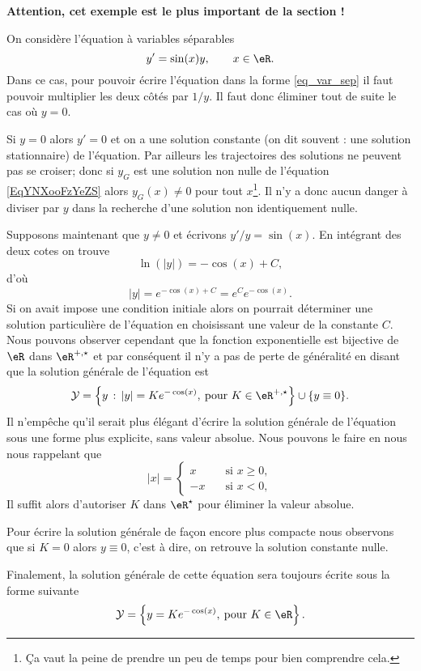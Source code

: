 \begin{example}\label{exemple_eq_hom}
  \textbf{Attention, cet exemple est le plus important de la section !}

On considère l'équation à variables séparables 
\begin{equation}    \label{EqYNXooFzYeZS}
  y' = \sin(x) y , \qquad x\in\eR.
\end{equation}
Dans ce cas, pour pouvoir écrire l'équation dans la forme \eqref{eq_var_sep} il faut pouvoir multiplier les deux c\^otés par $1/y$. Il faut donc éliminer tout de suite le cas o\`u $y = 0$. 

Si $y= 0$ alors $y' =0$ et on a une solution constante (on dit souvent : une solution stationnaire) de l'équation. Par ailleurs les trajectoires des solutions ne peuvent pas se croiser; donc si \( y_G\) est une solution non nulle de l'équation \eqref{EqYNXooFzYeZS} alors \( y_G(x)\neq 0\) pour tout \( x\)\footnote{Ça vaut la peine de prendre un peu de temps pour bien comprendre cela.}. Il n'y a donc aucun danger à diviser par \( y\) dans la recherche d'une solution non identiquement nulle.

Supposons maintenant que $y\neq 0$ et écrivons $y'/y = \sin(x)$. En intégrant des deux cotes on trouve 
\[
  \ln(|y|) =- \cos(x) +C, 
\]
d'où
\[
|y| = e^{- \cos(x) +C}= e^{C}e^{- \cos(x)}.
\]
Si on avait impose une condition initiale alors on pourrait déterminer une solution particulière de l'équation en choisissant une valeur de la constante $C$. Nous pouvons observer cependant que la fonction exponentielle est bijective de $\eR$ dans $\eR^{+,\star}$ et par conséquent il n'y a pas de perte de généralité en disant que la solution générale de l'équation est 
\begin{equation*}
  \mathcal{Y} = \left\{ y \,:\, |y| = Ke^{- \cos(x)}, \:\text{pour } K\in\eR^{+,\star}\right\}\cup\{y\equiv 0\}.
\end{equation*}
Il n'empêche qu'il serait plus élégant d'écrire la solution générale de l'équation sous une forme plus explicite, sans valeur absolue. Nous pouvons le faire en nous nous rappelant que 
\begin{equation*}
 |x| =  \begin{cases}
    x & \quad\text{si } x \geq 0 ,\\
    -x & \quad\text{si } x <0 ,
  \end{cases}
\end{equation*}
Il suffit alors d'autoriser $K$ dans $\eR^{\star}$ pour éliminer la valeur absolue. 

Pour écrire la solution générale de façon encore plus compacte nous observons que si $K=0$ alors $y \equiv 0$, c'est \`a dire, on retrouve la solution constante nulle. 

Finalement, la solution générale de cette équation sera toujours écrite sous la forme suivante
\begin{equation}
  \mathcal{Y} = \left\{ y = Ke^{- \cos(x)}, \:\text{pour } K\in\eR\right\}.
\end{equation}
\end{example}

